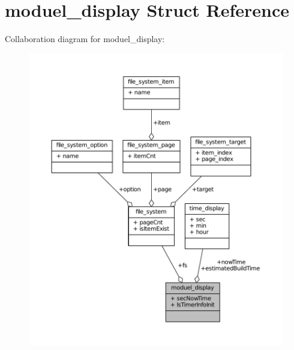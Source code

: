 \hypertarget{structmoduel__display}{}\section{moduel\+\_\+display Struct Reference}
\label{structmoduel__display}


Collaboration diagram for moduel\+\_\+display\+:\nopagebreak
\begin{figure}[H]
\begin{center}
\leavevmode
\includegraphics[width=350pt]{structmoduel__display__coll__graph}
\end{center}
\end{figure}
